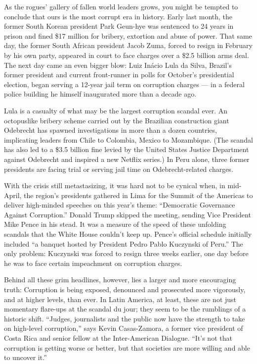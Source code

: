 As the rogues' gallery of fallen world leaders grows, you might be
tempted to conclude that ours is the most corrupt era in history. Early
last month, the former South Korean president Park Geun-hye was
sentenced to 24 years in prison and fined \$17 million for bribery,
extortion and abuse of power. That same day, the former South African
president Jacob Zuma, forced to resign in February by his own party,
appeared in court to face charges over a \$2.5 billion arms deal. The
next day came an even bigger blow: Luiz Inácio Lula da Silva, Brazil's
former president and current front-runner in polls for October's
presidential election, began serving a 12-year jail term on corruption
charges --- in a federal police building he himself inaugurated more
than a decade ago.

Lula is a casualty of what may be the largest corruption scandal ever.
An octopuslike bribery scheme carried out by the Brazilian construction
giant Odebrecht has spawned investigations in more than a dozen
countries, implicating leaders from Chile to Colombia, Mexico to
Mozambique. (The scandal has also led to a \$3.5 billion fine levied by
the United States Justice Department against Odebrecht and inspired a
new Netflix series.) In Peru alone, three former presidents are facing
trial or serving jail time on Odebrecht-related charges.

With the crisis still metastasizing, it was hard not to be cynical when,
in mid-April, the region's presidents gathered in Lima for the Summit of
the Americas to deliver high-minded speeches on this year's theme:
``Democratic Governance Against Corruption.'' Donald Trump skipped the
meeting, sending Vice President Mike Pence in his stead. It was a
measure of the speed of these unfolding scandals that the White House
couldn't keep up. Pence's official schedule initially included ``a
banquet hosted by President Pedro Pablo Kuczynski of Peru.'' The only
problem: Kuczynski was forced to resign three weeks earlier, one day
before he was to face certain impeachment on corruption charges.

Behind all these grim headlines, however, lies a larger and more
encouraging truth: Corruption is being exposed, denounced and prosecuted
more vigorously, and at higher levels, than ever. In Latin America, at
least, these are not just momentary flare-ups at the scandal du jour;
they seem to be the rumblings of a historic shift. ``Judges, journalists
and the public now have the strength to take on high-level corruption,''
says Kevin Casas-Zamora, a former vice president of Costa Rica and
senior fellow at the Inter-American Dialogue. ``It's not that corruption
is getting worse or better, but that societies are more willing and able
to uncover it.''

